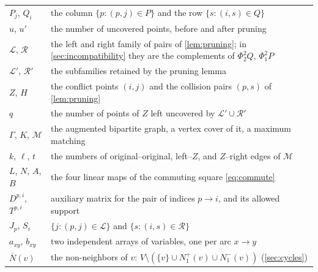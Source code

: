{\begin{tabularx}{\textwidth}{@{}lX@{}}
$P_j$, $Q_i$ & the column $\{p:(p,j)\in P\}$ and the row $\{s:(i,s)\in Q\}$ \\
$u$, $u'$ & the number of uncovered points, before and after pruning \\
$\mathcal L$, $\mathcal R$ & the left and right family of pairs of \cref{lem:pruning}; in \cref{sec:incompatibility} they are the complements of $\Phi_2^2Q$, $\Phi_1^2P$ \\
$\mathcal L'$, $\mathcal R'$ & the subfamilies retained by the pruning lemma \\
$Z$, $H$ & the conflict points $(i,j)$ and the collision pairs $(p,s)$ of \cref{lem:pruning} \\
$q$ & the number of points of $Z$ left uncovered by $\mathcal L'\cup\mathcal R'$ \\
$\Gamma$, $K$, $\mathcal M$ & the augmented bipartite graph, a vertex cover of it, a maximum matching \\
$k$, $\ell$, $t$ & the numbers of original--original, left--$Z$, and $Z$--right edges of $\mathcal M$ \\
$L$, $N$, $A$, $B$ & the four linear maps of the commuting square \eqref{eq:commute} \\
$D^{p,i}$, $T^{p,i}$ & auxiliary matrix for the pair of indices $p\to i$, and its allowed support \\
$J_p$, $S_i$ & $\{j:(p,j)\in\mathcal L\}$ and $\{s:(i,s)\in\mathcal R\}$ \\
$a_{xy}$, $b_{xy}$ & two independent arrays of variables, one per arc $x\to y$ \\
$\overline N(v)$ & the non-neighbors of $v$: $V\setminus(\{v\}\cup N_1^+(v)\cup N_1^-(v))$ (\cref{sec:cycles}) \\
\bottomrule
\end{tabularx}}
